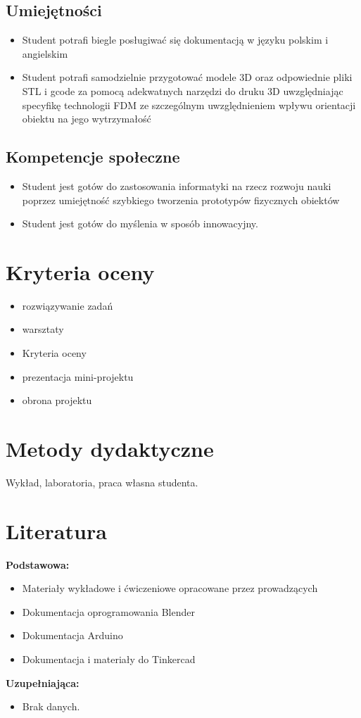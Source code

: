\documentclass[12pt, a4paper]{article}
\begin{document}
\subsection*{Umiejętności}
\begin{itemize}
  \item Student potrafi biegle posługiwać się dokumentacją w języku polskim i angielskim
  \item Student potrafi samodzielnie przygotować modele 3D oraz odpowiednie pliki STL i gcode za pomocą adekwatnych narzędzi do druku 3D uwzględniając specyfikę technologii FDM ze szczególnym uwzględnieniem wpływu orientacji obiektu na jego wytrzymałość
\end{itemize}

\subsection*{Kompetencje społeczne}
\begin{itemize}
  \item Student jest gotów do zastosowania informatyki na rzecz rozwoju nauki poprzez umiejętność szybkiego tworzenia prototypów fizycznych obiektów
  \item Student jest gotów do myślenia w sposób innowacyjny.
\end{itemize}

\section{Kryteria oceny}

\begin{itemize}
  \item rozwiązywanie zadań
  \item warsztaty
  \item Kryteria oceny
  \item prezentacja mini-projektu
  \item obrona projektu
\end{itemize}

\section{Metody dydaktyczne}

Wykład, laboratoria, praca własna studenta.

\section{Literatura}

\textbf{Podstawowa:}
\begin{itemize}
  \item Materiały wykładowe i ćwiczeniowe opracowane przez prowadzących
  \item Dokumentacja oprogramowania Blender
  \item Dokumentacja Arduino
  \item Dokumentacja i materiały do Tinkercad
\end{itemize}

\textbf{Uzupełniająca:}
\begin{itemize}
  \item Brak danych.
\end{itemize}
\end{document}
